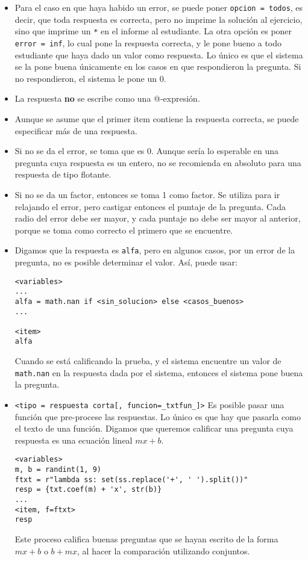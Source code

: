 \documentclass[12pt]{article}
\theoremstyle{definition}
\begin{document}
\begin{itemize}
  \item Para el caso en que haya habido un error, se puede poner \verb|opcion = todos|, es decir, que toda respuesta es correcta, pero no imprime la solución al ejercicio, sino que imprime un \verb|*| en el informe al estudiante. La otra opción es poner \verb|error = inf|, lo cual pone la respuesta correcta, y le pone bueno a todo estudiante que haya dado un valor como respuesta. Lo \'unico es que el sistema se la pone buena \'unicamente en los casos en que respondieron la pregunta. Si no respondieron, el sistema le pone un 0.
  \item La respuesta \textbf{no} se escribe como una @-expresión.
  \item Aunque se asume que el primer item contiene la respuesta correcta, se puede especificar más de una respuesta.  
  \item Si no se da el error, se toma que es 0. Aunque sería lo esperable en una pregunta cuya respuesta es un entero, no se recomienda en absoluto para una respuesta de tipo flotante. 
  \item Si no se da un factor, entonces se toma 1 como factor. Se utiliza para ir relajando el error, pero castigar entonces el puntaje de la pregunta. Cada radio del error debe ser mayor, y cada puntaje no debe ser mayor al anterior, porque se toma como correcto el primero que se encuentre.
  \item Digamos que la respuesta es \verb|alfa|, pero en algunos casos, por un error de la pregunta, no es posible determinar el valor. As\'i, puede usar:
\begin{verbatim}
<variables>
...
alfa = math.nan if <sin_solucion> else <casos_buenos>
...

<item>
alfa
\end{verbatim}

Cuando se est\'a calificando la prueba, y el sistema encuentre un valor de \verb|math.nan| en la respuesta dada por el sistema, entonces el sistema pone buena la pregunta.

\item \verb|<tipo = respuesta corta[, funcion=_txtfun_]>|
Es posible pasar una funci\'on que pre-procese las respuestas. Lo \'unico es que hay que pasarla como el texto de una funci\'on. Digamos que queremos calificar una pregunta cuya respuesta es una ecuaci\'on lineal $mx+b$.
\begin{verbatim}
<variables>
m, b = randint(1, 9)
ftxt = r"lambda ss: set(ss.replace('+', ' ').split())"
resp = {txt.coef(m) + 'x', str(b)}
...
<item, f=ftxt>
resp
\end{verbatim}
Este proceso califica buenas preguntas que se hayan escrito de la forma $mx+b$ o $b+mx$, al hacer la comparaci\'on utilizando conjuntos.
\end{itemize}
\end{document}
